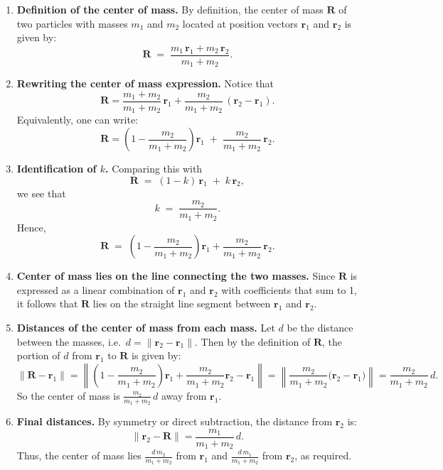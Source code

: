 \documentclass{article}
\begin{document}
\begin{enumerate}
\item \textbf{Definition of the center of mass.} By definition, the center of mass $\mathbf{R}$ of two particles with masses $m_1$ and $m_2$ located at position vectors $\mathbf{r}_1$ and $\mathbf{r}_2$ is given by:
\[
\mathbf{R} \;=\; \frac{m_1 \,\mathbf{r}_1 + m_2 \,\mathbf{r}_2}{m_1 + m_2}.
\]

\item \textbf{Rewriting the center of mass expression.} Notice that
\[
\mathbf{R}
= \frac{m_1 + m_2}{m_1 + m_2}\,\mathbf{r}_1 + \frac{m_2}{m_1 + m_2}\,(\mathbf{r}_2 - \mathbf{r}_1).
\]
Equivalently, one can write:
\[
\mathbf{R}
= \left(1 - \frac{m_2}{m_1 + m_2}\right)\mathbf{r}_1 \;+\; \frac{m_2}{m_1 + m_2}\,\mathbf{r}_2.
\]

\item \textbf{Identification of $k$.} Comparing this with
\[
\mathbf{R} \;=\; (1-k)\,\mathbf{r}_1 \;+\; k\,\mathbf{r}_2,
\]
we see that
\[
k \;=\; \frac{m_2}{m_1 + m_2}.
\]
Hence,
\[
\mathbf{R} \;=\; \left(1 - \frac{m_2}{m_1 + m_2}\right)\mathbf{r}_1 + \frac{m_2}{m_1 + m_2}\,\mathbf{r}_2.
\]

\item \textbf{Center of mass lies on the line connecting the two masses.} Since $\mathbf{R}$ is expressed as a linear combination of $\mathbf{r}_1$ and $\mathbf{r}_2$ with coefficients that sum to 1, it follows that $\mathbf{R}$ lies on the straight line segment between $\mathbf{r}_1$ and $\mathbf{r}_2$.

\item \textbf{Distances of the center of mass from each mass.} Let $d$ be the distance between the masses, i.e.\ $d = \|\mathbf{r}_2 - \mathbf{r}_1\|$. Then by the definition of $\mathbf{R}$, the portion of $d$ from $\mathbf{r}_1$ to $\mathbf{R}$ is given by:
\[
\|\mathbf{R} - \mathbf{r}_1\|
= \left\|\left(1 - \frac{m_2}{m_1 + m_2}\right)\mathbf{r}_1 + \frac{m_2}{m_1 + m_2}\mathbf{r}_2 - \mathbf{r}_1\right\|
= \left\|\frac{m_2}{m_1 + m_2}\bigl(\mathbf{r}_2 - \mathbf{r}_1\bigr)\right\|
= \frac{m_2}{m_1 + m_2}\, d.
\]
So the center of mass is $\frac{m_2}{m_1 + m_2}\,d$ away from $\mathbf{r}_1$.

\item \textbf{Final distances.} By symmetry or direct subtraction, the distance from $\mathbf{r}_2$ is:
\[
\|\mathbf{r}_2 - \mathbf{R}\|
= \frac{m_1}{m_1 + m_2}\, d.
\]
Thus, the center of mass lies $\displaystyle \frac{d\,m_2}{m_1 + m_2}$ from $\mathbf{r}_1$ and $\displaystyle \frac{d\,m_1}{m_1 + m_2}$ from $\mathbf{r}_2$, as required.

\end{enumerate}
\end{document}
